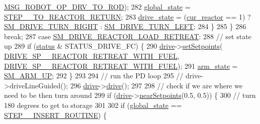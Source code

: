 \begin{DoxyCode}
      \hyperlink{config_8h_a07b36fc0265003a9ba81111a770f1ce9}{MSG\_ROBOT\_OP\_DRV\_TO\_ROD});
282                     \hyperlink{class_threaded_robot_a92782be4dc437d7e84b04d20a39a5de3}{global\_state} = \hyperlink{_threaded_robot_8hpp_a4fc7e302c22b562e209b43ca06b8965d}{STEP\_\_TO\_REACTOR\_RETURN};
283                     \hyperlink{class_threaded_robot_a8cc4fc4f00ff6566604f9499d427698a}{drive\_state} = (\hyperlink{class_threaded_robot_a3c2f2358f32ba58846b13e95b3c55527}{cur\_reactor} == 1) ? 
      \hyperlink{_threaded_robot_8hpp_a065168c9946205caff716032d3f26d1b}{SM\_DRIVE\_TURN\_RIGHT} : \hyperlink{_threaded_robot_8hpp_a0dfd6ccb0681319880cf03a62262aa43}{SM\_DRIVE\_TURN\_LEFT};
284                 \}
285             \}
286             \textcolor{keywordflow}{break};
287         \textcolor{keywordflow}{case} \hyperlink{_threaded_robot_8hpp_a59b73e9a00ed2ca9fbfc22a25281ab9f}{SM\_DRIVE\_REACTOR\_LOAD\_RETREAT}:
288             \textcolor{comment}{// set state up}
289             \textcolor{keywordflow}{if} (\hyperlink{class_threaded_robot_a10f3a9d1b27ca8e7a1ada75323c75879}{status} & STATUS\_DRIVE\_FC) \{
290                 \hyperlink{class_threaded_robot_ad666af7d773c8096210f6b5c4d060086}{drive}->\hyperlink{class_drive_train_a824147fd2c57fe25c0f64a80218ca39e}{setSetpoints}(
      \hyperlink{config_8h_a3972e338f33c1f5ec5e89feac6d90ff0}{DRIVE\_SP\_\_REACTOR\_RETREAT\_WITH\_FUEL}, 
      \hyperlink{config_8h_a3972e338f33c1f5ec5e89feac6d90ff0}{DRIVE\_SP\_\_REACTOR\_RETREAT\_WITH\_FUEL});
291                 \hyperlink{class_threaded_robot_a19026abe96d44213f7e8b3983be2d968}{arm\_state} = \hyperlink{_threaded_robot_8hpp_ab81e7b2b3227c0de1b76dcfdddb78f75}{SM\_ARM\_UP};
292             \}
293 
294             \textcolor{comment}{// run the PD loop}
295             \textcolor{comment}{// drive->driveLineGuided();}
296             \hyperlink{class_threaded_robot_ad666af7d773c8096210f6b5c4d060086}{drive}->\hyperlink{class_drive_train_a53087c84c085d1f06b06d2e191e34882}{drive}();
297 
298             \textcolor{comment}{// check if we are where we need to be then turn around}
299             \textcolor{keywordflow}{if} (\hyperlink{class_threaded_robot_ad666af7d773c8096210f6b5c4d060086}{drive}->\hyperlink{class_drive_train_a3817b51633041e331de658be05396ec9}{nearSetpoints}(0.5, 0.5)) \{
300                 \textcolor{comment}{// turn 180 degrees to get to storage}
301 
302                 \textcolor{keywordflow}{if} (\hyperlink{class_threaded_robot_a92782be4dc437d7e84b04d20a39a5de3}{global\_state} == \hyperlink{_threaded_robot_8hpp_aa746f89a7ab4e61cfe763ca6ad8a2e22}{STEP\_\_INSERT\_ROUTINE}) \{

\end{DoxyCode}
